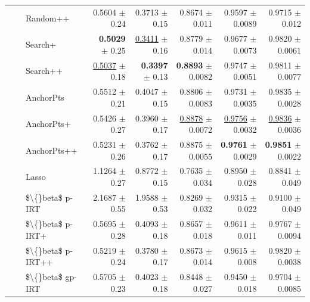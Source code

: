 \begin{longtable}{llp{}rrrrr}
 &  & Random++ & 0.5604 {\scriptsize $\pm$ 0.24} & 0.3713 {\scriptsize $\pm$ 0.15} & 0.8674 {\scriptsize $\pm$ 0.011} & 0.9597 {\scriptsize $\pm$ 0.0089} & 0.9715 {\scriptsize $\pm$ 0.012} \\
 &  & Search+ & \textbf{0.5029} {\scriptsize $\pm$ 0.25} & \underline{0.3411} {\scriptsize $\pm$ 0.16} & 0.8779 {\scriptsize $\pm$ 0.014} & 0.9677 {\scriptsize $\pm$ 0.0073} & 0.9820 {\scriptsize $\pm$ 0.0061} \\
 &  & Search++ & \underline{0.5037} {\scriptsize $\pm$ 0.18} & \textbf{0.3397} {\scriptsize $\pm$ 0.13} & \textbf{0.8893} {\scriptsize $\pm$ 0.0082} & 0.9747 {\scriptsize $\pm$ 0.0051} & 0.9811 {\scriptsize $\pm$ 0.0077} \\
 &  & AnchorPts & 0.5512 {\scriptsize $\pm$ 0.21} & 0.4047 {\scriptsize $\pm$ 0.15} & 0.8806 {\scriptsize $\pm$ 0.0083} & 0.9731 {\scriptsize $\pm$ 0.0035} & 0.9835 {\scriptsize $\pm$ 0.0028} \\
 &  & AnchorPts+ & 0.5426 {\scriptsize $\pm$ 0.27} & 0.3960 {\scriptsize $\pm$ 0.17} & \underline{0.8878} {\scriptsize $\pm$ 0.0072} & \underline{0.9756} {\scriptsize $\pm$ 0.0032} & \underline{0.9836} {\scriptsize $\pm$ 0.0036} \\
 &  & AnchorPts++ & 0.5231 {\scriptsize $\pm$ 0.26} & 0.3762 {\scriptsize $\pm$ 0.17} & 0.8875 {\scriptsize $\pm$ 0.0055} & \textbf{0.9761} {\scriptsize $\pm$ 0.0029} & \textbf{0.9851} {\scriptsize $\pm$ 0.0022} \\
 &  & Lasso & 1.1264 {\scriptsize $\pm$ 0.27} & 0.8772 {\scriptsize $\pm$ 0.15} & 0.7635 {\scriptsize $\pm$ 0.034} & 0.8950 {\scriptsize $\pm$ 0.028} & 0.8841 {\scriptsize $\pm$ 0.049} \\
 &  & \$\textbackslash\{\}beta\$ p-IRT & 2.1687 {\scriptsize $\pm$ 0.55} & 1.9588 {\scriptsize $\pm$ 0.53} & 0.8269 {\scriptsize $\pm$ 0.032} & 0.9315 {\scriptsize $\pm$ 0.022} & 0.9100 {\scriptsize $\pm$ 0.049} \\
 &  & \$\textbackslash\{\}beta\$ p-IRT+ & 0.5695 {\scriptsize $\pm$ 0.28} & 0.4093 {\scriptsize $\pm$ 0.18} & 0.8657 {\scriptsize $\pm$ 0.018} & 0.9611 {\scriptsize $\pm$ 0.011} & 0.9767 {\scriptsize $\pm$ 0.0094} \\
 &  & \$\textbackslash\{\}beta\$ p-IRT++ & 0.5219 {\scriptsize $\pm$ 0.24} & 0.3780 {\scriptsize $\pm$ 0.17} & 0.8673 {\scriptsize $\pm$ 0.014} & 0.9615 {\scriptsize $\pm$ 0.008} & 0.9820 {\scriptsize $\pm$ 0.0038} \\
 &  & \$\textbackslash\{\}beta\$ gp-IRT & 0.5705 {\scriptsize $\pm$ 0.23} & 0.4023 {\scriptsize $\pm$ 0.18} & 0.8448 {\scriptsize $\pm$ 0.027} & 0.9450 {\scriptsize $\pm$ 0.018} & 0.9704 {\scriptsize $\pm$ 0.0085} \\

\end{longtable}
